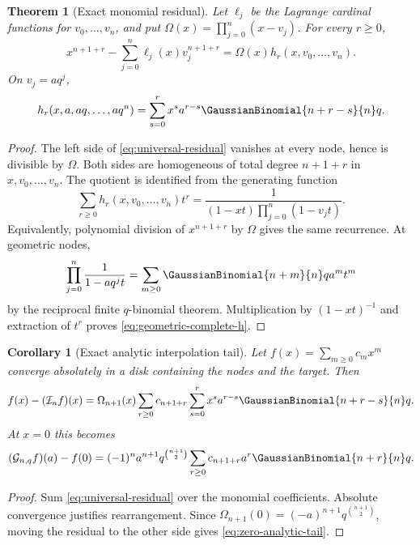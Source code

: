 \documentclass[11pt,a4paper,oneside]{article}
\newtheorem{theorem}{Theorem}[section]
\newtheorem{corollary}[corollary]{Corollary}
\theoremstyle{definition}
\theoremstyle{remark}
\newcommand{\Gop}{\mathcal G}
\newcommand{\Iop}{\mathcal I}
\begin{document}
\begin{theorem}[Exact monomial residual]
\label{thm:universal-residual}
Let $\ell_j$ be the Lagrange cardinal functions for
$v_0,\ldots,v_n$, and put $\Omega(x)=\prod_{j=0}^n(x-v_j)$.  For every
$r\ge0$,
\begin{equation}
 x^{n+1+r}-\sum_{j=0}^n\ell_j(x)v_j^{n+1+r}
 =\Omega(x)h_r(x,v_0,\ldots,v_n).
 \label{eq:universal-residual}
\end{equation}
On $v_j=aq^j$,
\begin{equation}
 h_r(x,a,aq,\ldots,aq^n)
 =\sum_{s=0}^r x^s a^{r-s}\GaussianBinomial{n+r-s}{n}q.
 \label{eq:geometric-complete-h}
\end{equation}
\end{theorem}

\begin{proof}
The left side of \eqref{eq:universal-residual} vanishes at every node, hence is
divisible by $\Omega$.  Both sides are homogeneous of total degree $n+1+r$
in $x,v_0,\ldots,v_n$.  The quotient is identified from the generating
function
\[
 \sum_{r\ge0}h_r(x,v_0,\ldots,v_n)t^r
 =\frac1{(1-xt)\prod_{j=0}^n(1-v_jt)}.
\]
Equivalently, polynomial division of $x^{n+1+r}$ by $\Omega$ gives the same
recurrence.  At geometric nodes,
\[
 \prod_{j=0}^n\frac1{1-aq^jt}
 =\sum_{m\ge0}\GaussianBinomial{n+m}{n}q a^mt^m
\]
by the reciprocal finite $q$-binomial theorem.  Multiplication by
$(1-xt)^{-1}$ and extraction of $t^r$ proves
\eqref{eq:geometric-complete-h}.
\end{proof}

\begin{corollary}[Exact analytic interpolation tail]
\label{cor:analytic-residual}
Let $f(x)=\sum_{m\ge0}c_mx^m$ converge absolutely in a disk containing the
nodes and the target.  Then
\begin{equation}
 f(x)-(\Iop_nf)(x)
 =\Omega_{n+1}(x)
 \sum_{r\ge0}c_{n+1+r}
 \sum_{s=0}^r x^sa^{r-s}\GaussianBinomial{n+r-s}{n}q.
 \label{eq:analytic-residual}
\end{equation}
At $x=0$ this becomes
\begin{equation}
 (\Gop_{n,q}f)(a)-f(0)
 =(-1)^n a^{n+1}q^{\binom{n+1}{2}}
 \sum_{r\ge0}c_{n+1+r}a^r\GaussianBinomial{n+r}{n}q.
 \label{eq:zero-analytic-tail}
\end{equation}
\end{corollary}

\begin{proof}
Sum \eqref{eq:universal-residual} over the monomial coefficients.  Absolute
convergence justifies rearrangement.  Since
$\Omega_{n+1}(0)=(-a)^{n+1}q^{\binom{n+1}{2}}$, moving the residual to the
other side gives \eqref{eq:zero-analytic-tail}.
\end{proof}
\end{document}
